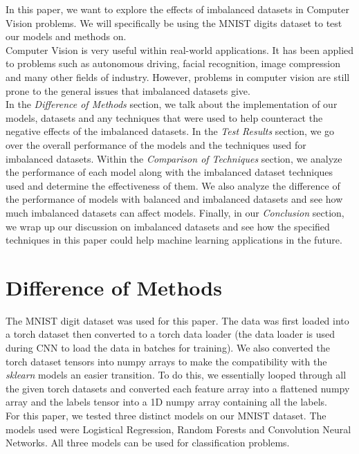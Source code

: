 \documentclass[conference]{IEEEtran}
\begin{document}
In this paper, we want to explore the effects of imbalanced datasets in Computer Vision problems. We will specifically be using the MNIST digits dataset to test our models and methods on. \\

Computer Vision is very useful within real-world applications. It has been applied to problems such as autonomous driving, facial recognition, image compression and many other fields of industry. However, problems in computer vision are still prone to the general issues that imbalanced datasets give.\\

In the \emph{Difference of Methods} section, we talk about the implementation of our models, datasets and any techniques that were used to help counteract the negative effects of the imbalanced datasets. In the \emph{Test Results} section, we go over the overall performance of the models and the techniques used for imbalanced datasets. Within the \emph{Comparison of Techniques} section, we analyze the performance of each model along with the imbalanced dataset techniques used and determine the effectiveness of them. We also analyze the difference of the performance of models with balanced and imbalanced datasets and see how much imbalanced datasets can affect models. Finally, in our \emph{Conclusion} section, we wrap up our discussion on imbalanced datasets and see how the specified techniques in this paper could help machine learning applications in the future. 

\section{Difference of Methods}

The MNIST digit dataset was used for this paper. The data was first loaded into a torch dataset then converted to a torch data loader (the data loader is used during CNN to load the data in batches for training). We also converted the torch dataset tensors into numpy arrays to make the compatibility with the \emph{sklearn} models an easier transition. To do this, we essentially looped through all the given torch datasets and converted each feature array into a flattened numpy array and the labels tensor into a 1D numpy array containing all the labels. \\

For this paper, we tested three distinct models on our MNIST dataset. The models used were Logistical Regression, Random Forests and Convolution Neural Networks. All three models can be used for classification problems. \\
\end{document}
